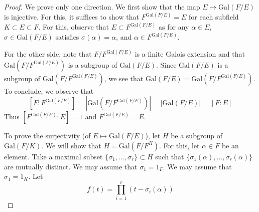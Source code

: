 \begin{proof}
We prove only one direction. We first show that the map $E\mapsto \mathrm{Gal}(F/E)$ is injective. For this, it suffices to show that $F^{\mathrm{Gal}(F/E)}=E$ for each subfield $K\subset E\subset F$. For this, observe that $E\subset F^{\mathrm{Gal}(F/E)}$ as for any $\alpha \in E$, $\sigma \in \mathrm{Gal}(F/E)$ satisfies $\sigma (\alpha )=\alpha $, and $\alpha \in F^{\mathrm{Gal}(F/E)}$. 

\bigskip

For the other side, note that $F/F^{\mathrm{Gal}(F/E)}$ is a finite Galois extension and that $\mathrm{Gal}(F/F^{\mathrm{Gal}(F/E)})$ is a subgroup of $\mathrm{Gal}(F/E)$. Since $\mathrm{Gal}(F/E)$ is a subgroup of $\mathrm{Gal}(F/F^{\mathrm{Gal}(F/E)})$, we see that $\mathrm{Gal}(F/E)=\mathrm{Gal}(F/F^{\mathrm{Gal}(F/E)})$. To conclude, we observe that
\[[F:F^{\mathrm{Gal}(F/E)}]=|\mathrm{Gal}(F/F^{\mathrm{Gal}(F/E)})|=|\mathrm{Gal}(F/E)|=[F:E]\]
Thus $[F^{\mathrm{Gal}(F/E)}:E]=1$ and $F^{\mathrm{Gal}(F/E)}=E$. 

\bigskip

To prove the surjectivity (of $E\mapsto \mathrm{Gal}(F/E)$), let $H$ be a subgroup of $\mathrm{Gal}(F/K)$. We will show that $H=\mathrm{Gal}(F/F^{H})$. For this, let $\alpha \in F$ be an element. Take a maximal subset $\{\sigma_1,\ldots ,\sigma _{r}\}\subset H$ such that $\{\sigma_1(\alpha ),\ldots ,\sigma _{r}(\alpha )\}$ are mutually distinct. We may assume that $\sigma_1=\mathrm{1}_{F}$. We may assume that $\sigma_1=\mathrm{1}_{K}$. Let 
\[f(t)=\prod^{r}_{i=1}(t-\sigma _{i}(\alpha ))\]
\end{proof}
\vspace{2ex}

